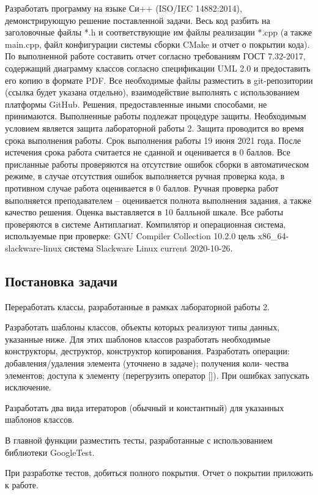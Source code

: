 \documentclass[a4paper,12pt]{article}
\begin{document}
Разработать программу на языке Си++ (ISO/IEC 14882:2014), демонстрирующую решение поставленной задачи.
Весь код разбить на заголовочные файлы *.h и соответствующие им файлы реализации *.cpp (а также main.cpp, файл конфигурации системы сборки CMake и отчет о покрытии кода).
По выполненной работе составить отчет согласно требованиям ГОСТ 7.32-2017, содержащий диаграмму классов согласно спецификации UML 2.0 и предоставить его копию в формате PDF.
Все необходимые файлы разместить в git-репозитории (ссылка будет указана отдельно), взаимодействие выполнять с использованием платформы GitHub.
Решения, предоставленные иными способами, не принимаются.
Выполненные работы подлежат процедуре защиты.
Необходимым условием является защита лабораторной работы 2.
Защита проводится во время срока выполнения работы.
Срок выполнения работы 19 июня 2021 года.
После истечения срока работа считается не сданной и оценивается в 0 баллов.
Все присланные работы проверяются на отсутствие ошибок сборки в автоматическом режиме, в случае отсутствия ошибок выполняется ручная проверка кода, в противном случае работа оценивается в 0 баллов.
Ручная проверка работ выполняется преподавателем – оценивается полнота выполнения задания, а также качество решения.
Оценка выставляется в 10 балльной шкале.
Все работы проверяются в системе Антиплагиат.
Компилятор и операционная система, используемые при проверке: GNU Compiler Collection 10.2.0 цель x86\_64-slackware-linux система Slackware Linux current 2020-10-26.

\subsection*{Постановка задачи}

Переработать классы, разработанные в рамках лабораторной работы 2.


Разработать шаблоны классов, объекты которых реализуют типы данных, указанные ниже. Для этих шаблонов классов разработать необходимые конструкторы, деструктор, конструктор копирования.
Разработать операции: добавления/удаления элемента (уточнено в задаче); получения коли- чества элементов; доступа к элементу (перегрузить оператор []). При ошибках запускать исключение.

Разработать два вида итераторов (обычный и константный) для указанных шаблонов классов.

В главной функции разместить тесты, разработанные с использованием библиотеки GoogleTest.

При разработке тестов, добиться полного покрытия.
Отчет о покрытии приложить к работе.
\end{document}
